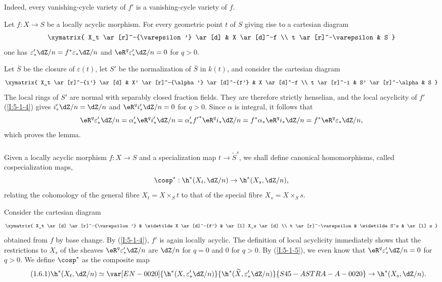 Indeed, every vanishing-cycle variety of $f'$ is a vanishing-cycle
variety of $f$.

\begin{lemma}\label{I:5-1-5}
Let $f:X\to S$ be a locally acyclic morphism. For every geometric point
$t$ of $S$ giving rise to a cartesian diagram
\[\xymatrix{
  X_t \ar[r]^-{\varepsilon'} \ar[d]
    & X \ar[d]^-f \\
  t \ar[r]^-\varepsilon
    & S
}\]
one has $\varepsilon_*'\dZ/n=f^*\varepsilon_*\dZ/n$ and
$\eR^q\varepsilon_*'\dZ/n=0$ for $q>0$.
\end{lemma}

Let $\bar S$ be the closure of $\varepsilon(t)$, let $S'$ be the
normalization of $\bar S$ in $k(t)$, and consider the cartesian diagram
\[\xymatrix{
  X_t \ar[r]^-{i'} \ar[d]
    & X' \ar[r]^-{\alpha'} \ar[d]^-{f'}
    & X \ar[d]^-f \\
  t \ar[r]^-i
    & S' \ar[r]^-\alpha
    & S
}\]
The local rings of $S'$ are normal with separably closed fraction fields.
They are therefore strictly henselian, and the local acyclicity of $f'$
(\ref{I:5-1-4}) gives
$i'_*\dZ/n=\dZ/n$ and $\eR^q i'_*\dZ/n=0$ for $q>0$. Since $\alpha$
is integral, it follows that
\[
  \eR^q\varepsilon_*'\dZ/n
    = \alpha_*' \eR^q i_*' \dZ/n
    = \alpha_*' {f'}^* \eR^q i_* \dZ/n
    = f^* \alpha_* \eR^q i_* \dZ/n
    = f^* \eR^q \varepsilon_* \dZ/n \text{,}
\]
which proves the lemma.

\subsubsection{}\label{I:5-1-6}

Given a locally acyclic morphism $f:X\to S$ and a specialization map
$t\to\widetilde S^s$, we shall define canonical homomorphisms, called
cospecialization maps,
\[
  \cosp^* : \h^*(X_t,\dZ/n) \to \h^*(X_s,\dZ/n)\text{,}
\]
relating the cohomology of the general fibre $X_t=X\times_St$ to that of
the special fibre $X_s=X\times_Ss$.

Consider the cartesian diagram
\[\xymatrix{
  X_t \ar[d] \ar[r]^-{\varepsilon'}
    & \widetilde X \ar[d]^-{f'}
    & \ar[l] X_s \ar[d] \\
  t \ar[r]^-\varepsilon
    & \widetilde S^s
    & \ar[l] s
}\]
obtained from $f$ by base change. By (\ref{I:5-1-4}), $f'$ is again
locally acyclic. The definition of local acyclicity immediately shows that
the restrictions to $X_s$ of the sheaves $\eR^q\varepsilon_*'\dZ/n$ are
$\dZ/n$ for $q=0$ and $0$ for $q>0$. By (\ref{I:5-1-5}), we even know
that $\eR^q\varepsilon_*'\dZ/n=0$ for $q>0$. We define
$\cosp^*$ as the composite map
\begin{equation*}\tag{1.6.1}\label{I:eq:5-1-6-1}
  \h^*(X_t,\dZ/n) \simeq \var[EN-0020]{\h^*(X,\varepsilon_*' \dZ/n)}{\h^*(\widetilde X,\varepsilon_*' \dZ/n)}{S45-ASTRA-A-0020} \to \h^*(X_s,\dZ/n) \text{.}
\end{equation*}

